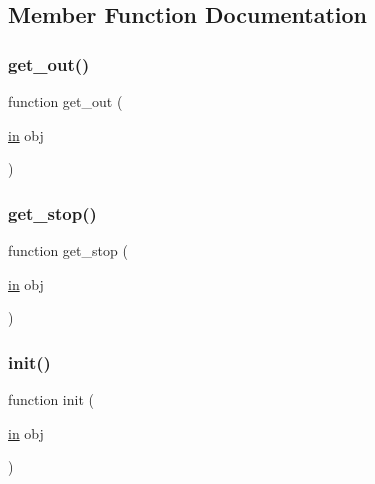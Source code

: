 \subsection{Member Function Documentation}
\mbox{\label{class_wrapper_a15af7c208437e3c98d1f130b45a36a37}} 
\subsubsection{\texorpdfstring{get\+\_\+out()}{get\_out()}}
{\footnotesize\ttfamily function get\+\_\+out (\begin{DoxyParamCaption}\item[{\hyperlink{class_wrapper_a5e252d97ca5bf85c5753e2914673eead}{in}}]{obj }\end{DoxyParamCaption})}

\mbox{\label{class_wrapper_aaba4a98b8b3bf391348722f0f227e333}} 
\subsubsection{\texorpdfstring{get\+\_\+stop()}{get\_stop()}}
{\footnotesize\ttfamily function get\+\_\+stop (\begin{DoxyParamCaption}\item[{\hyperlink{class_wrapper_a5e252d97ca5bf85c5753e2914673eead}{in}}]{obj }\end{DoxyParamCaption})}

\mbox{\label{class_wrapper_a7d486dd79e7c7bc857ffaa4e273d27c5}} 
\subsubsection{\texorpdfstring{init()}{init()}}
{\footnotesize\ttfamily function init (\begin{DoxyParamCaption}\item[{\hyperlink{class_wrapper_a5e252d97ca5bf85c5753e2914673eead}{in}}]{obj }\end{DoxyParamCaption})}

\mbox{\label{class_wrapper_a9c889c73b9d4b80dde64dfe385ed747e}} 
